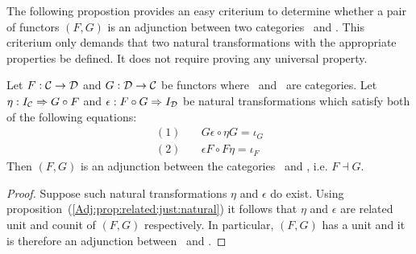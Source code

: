 The following propostion provides an easy criterium to determine whether
a pair of functors $(F,G)$ is an adjunction between two categories \Cat\ and
\Dat. This criterium only demands that two natural transformations
with the appropriate properties be defined. It does not require proving
any universal property.
\begin{prop}\label{Adj:prop:adjunction:criteria}
    Let $F:\mbox{$\cal C$}\to\mbox{$\cal D$}$ and $G:\mbox{$\cal D$}\to\mbox{$\cal C$}$ be functors where \Cat\ and \Dat\ 
    are categories. Let $\eta:I_{\cal C}\Rightarrow G\circ F$ and 
    $\epsilon:F\circ G\Rightarrow I_{\cal D}$ be natural transformations
    which satisfy both of the following equations:
        \begin{eqnarray*}
            (1)&\ &G\epsilon\circ\eta G=\iota_{G}\\
            (2)&\ &\epsilon F \circ F\eta=\iota_{F}
        \end{eqnarray*}
    Then $(F,G)$ is an adjunction between the categories \Cat\ and \Dat, 
    i.e. $F\dashv G$.
\end{prop}
\begin{proof}
    Suppose such natural transformations $\eta$ and $\epsilon$ do exist.
    Using proposition~(\ref{Adj:prop:related:just:natural}) it follows
    that $\eta$ and $\epsilon$ are related unit and counit of $(F,G)$
    respectively. In particular, $(F,G)$ has a unit and it is therefore
    an adjunction between \Cat\ and \Dat.
\end{proof}




